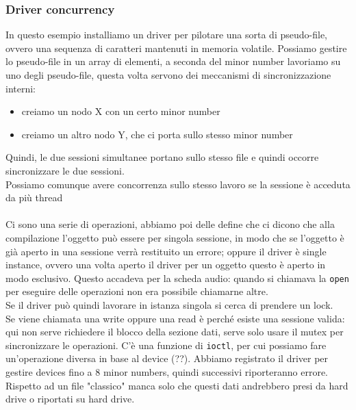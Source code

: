 \documentclass[12pt, oneside]{extbook}
\begin{document}
\subsubsection*{Driver concurrency}
In questo esempio installiamo un driver per pilotare una sorta di pseudo-file, ovvero una sequenza di caratteri mantenuti in memoria volatile. Possiamo gestire lo pseudo-file in un array di elementi, a seconda del minor number lavoriamo su uno degli pseudo-file, questa volta servono dei meccanismi di sincronizzazione interni:
\begin{itemize}
	\item creiamo un nodo X con un certo minor number
	\item creiamo un altro nodo Y, che ci porta sullo stesso minor number
\end{itemize}
Quindi, le due sessioni simultanee portano sullo stesso file e quindi occorre sincronizzare le due sessioni.\\Possiamo comunque avere concorrenza sullo stesso lavoro se la sessione è acceduta da più thread\\\\Ci sono una serie di operazioni, abbiamo poi delle define che ci dicono che alla compilazione l'oggetto può essere per singola sessione, in modo che se l'oggetto è già aperto in una sessione verrà restituito un errore; oppure il driver è single instance, ovvero una volta aperto il driver per un oggetto questo è aperto in modo esclusivo. Questo accadeva per la scheda audio: quando si chiamava la \texttt{open} per eseguire delle operazioni non era possibile chiamarne altre.\\Se il driver può quindi lavorare in istanza singola si cerca di prendere un lock.\\Se viene chiamata una write oppure una read è perché esiste una sessione valida: qui non serve richiedere il blocco della sezione dati, serve solo usare il mutex per sincronizzare le operazioni. C'è una funzione di \texttt{ioctl}, per cui possiamo fare un'operazione diversa in base al device (??). Abbiamo registrato il driver per gestire devices fino a 8 minor numbers, quindi successivi riporteranno errore. Rispetto ad un file "classico" manca solo che questi dati andrebbero presi da hard drive o riportati su hard drive.
\end{document}
